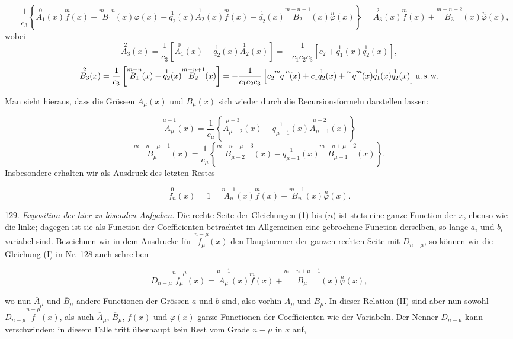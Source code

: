 \documentclass[11pt]{article}
\providecommand{\weq}[2]{\begin{equation}\tag{#1}#2\end{equation}}
\begin{document}
\[
= \frac{1}{c_3}\left\{ \overset{0}{A_1}(x)\overset{m}{f}(x) + \overset{m-n}{B_1}(x)\varphi(x) - \overset{1}{q_2}(x)\overset{1}{A_2}(x)\overset{m}{f}(x) - \overset{1}{q_2}(x)\overset{m-n+1}{B_2}(x)\overset{n}{\varphi}(x) \right\} = \overset{2}{A_3}(x)\overset{m}{f}(x) + \overset{m-n+2}{B_3}(x)\overset{n}{\varphi}(x),
\]
wobei
\[
\overset{2}{A_3}(x) = \frac{1}{c_3}\left[ \overset{0}{A_1}(x) - \overset{1}{q_2}(x)\overset{1}{A_2}(x) \right] = +\frac{1}{c_1c_2c_3}\left[ c_2 + \overset{1}{q_1}(x)\overset{1}{q_2}(x) \right],
\]
\[
\overset{2}{B_3}(x) = \frac{1}{c_3}\left[ \overset{m-n}{B_1}(x) - \overset{1}{q_2}(x)\overset{m-n+1}{B_2}(x) \right] = -\frac{1}{c_1c_2c_3}\left[ c_2\overset{m-n}{q}(x) + c_1\overset{1}{q_2}(x) + \overset{n-m}{q}(x)\overset{1}{q_1}(x)\overset{1}{q_2}(x) \right] \text{u.\,s.\,w.}
\]

Man sieht hieraus, dass die Grössen $A_\mu(x)$ und $B_\mu(x)$ sich wieder
durch die Recursionsformeln darstellen lassen:

\[
\overset{\mu-1}{A_\mu}(x) = \frac{1}{c_\mu}\left\{ \overset{\mu-3}{A_{\mu-2}}(x) - \overset{1}{q_{\mu-1}}(x)\overset{\mu-2}{A_{\mu-1}}(x) \right\}
\]
\[
\overset{m-n+\mu-1}{B_\mu}(x) = \frac{1}{c_\mu}\left\{ \overset{m-n+\mu-3}{B_{\mu-2}}(x) - \overset{1}{q_{\mu-1}}(x)\overset{m-n+\mu-2}{B_{\mu-1}}(x) \right\}.
\]
Insbesondere erhalten wir als Ausdruck des letzten Restes

\weq{n}{\overset{0}{f_n}(x) = 1 = \overset{n-1}{A_n}(x)\overset{m}{f}(x) + \overset{m-1}{B_n}(x)\overset{n}{\varphi}(x).}

129. \textit{Exposition der hier zu lösenden Aufgaben.} Die rechte Seite
der Gleichungen (1) bis ($n$) ist stets eine ganze Function der $x$, ebenso
wie die linke; dagegen ist sie als Function der Coefficienten betrachtet
im Allgemeinen eine gebrochene Function derselben, so lange $a_i$ und $b_i$
variabel sind. Bezeichnen wir in dem Ausdrucke für $\overset{n-\mu}{f_\mu}(x)$ den Haupt\-nenner der ganzen rechten Seite mit $D_{n-\mu}$, so können wir die
Gleichung (I) in Nr. 128 auch schreiben

\weq{II}{D_{n-\mu}\overset{n-\mu}{f_\mu}(x) = \overset{\mu-1}{\overline{A}_\mu}(x)\overset{m}{f}(x) + \overset{m-n+\mu-1}{\overline{B}_\mu}(x)\overset{n}{\varphi}(x),}

wo nun $\overline{A}_\mu$ und $\overline{B}_\mu$ andere Functionen der Grössen $a$ und $b$ sind,
also vorhin $A_\mu$ und $B_\mu$. In dieser Relation (II) sind aber nun sowohl
$D_{n-\mu}\overset{n-\mu}{f}(x)$, als auch $\overline{A}_\mu$, $\overline{B}_\mu$, $f(x)$ und $\varphi(x)$ ganze Functionen der
Coefficienten wie der Variabeln. Der Nenner $D_{n-\mu}$ kann verschwinden;
in diesem Falle tritt überhaupt kein Rest vom Grade $n-\mu$ in $x$ auf,
\end{document}
